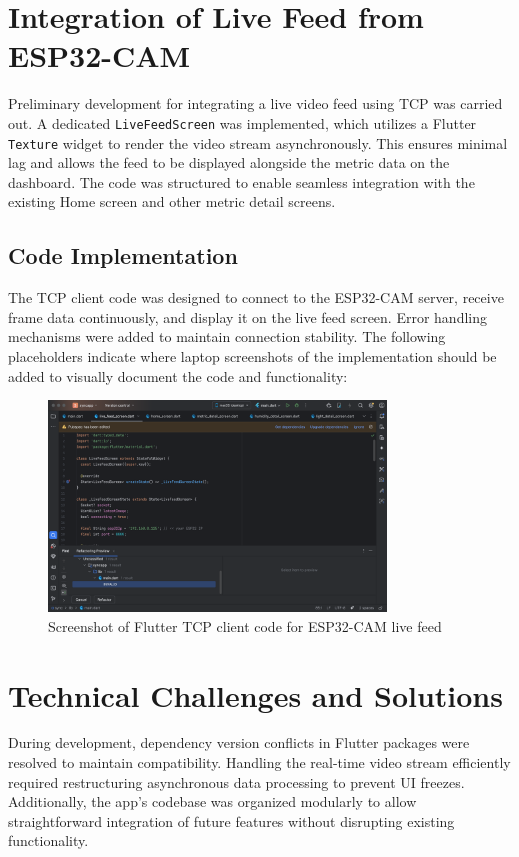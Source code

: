 \documentclass[../weekly]{subfiles}
\begin{document}
\section{Integration of Live Feed from ESP32-CAM}

Preliminary development for integrating a live video feed using TCP was carried out. A dedicated \texttt{LiveFeedScreen} was implemented, which utilizes a Flutter \texttt{Texture} widget to render the video stream asynchronously. This ensures minimal lag and allows the feed to be displayed alongside the metric data on the dashboard. The code was structured to enable seamless integration with the existing Home screen and other metric detail screens.

\subsection{Code Implementation}

The TCP client code was designed to connect to the ESP32-CAM server, receive frame data continuously, and display it on the live feed screen. Error handling mechanisms were added to maintain connection stability. The following placeholders indicate where laptop screenshots of the implementation should be added to visually document the code and functionality:

\begin{figure}[H]
\centering
\includegraphics[width=0.8\textwidth]{ss.png}
\caption{Screenshot of Flutter TCP client code for ESP32-CAM live feed}
\end{figure}



\section{Technical Challenges and Solutions}

During development, dependency version conflicts in Flutter packages were resolved to maintain compatibility. Handling the real-time video stream efficiently required restructuring asynchronous data processing to prevent UI freezes. Additionally, the app’s codebase was organized modularly to allow straightforward integration of future features without disrupting existing functionality.
\end{document}
